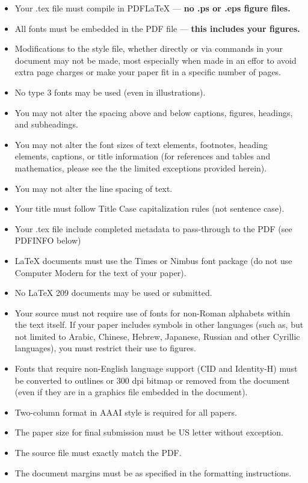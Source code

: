 \documentclass[letterpaper]{article} %
\begin{document}
\begin{itemize}
\item Your .tex file must compile in PDF\LaTeX{} --- \textbf{ no .ps or .eps figure files.}
\item All fonts must be embedded in the PDF file --- \textbf{ this includes your figures.}
\item Modifications to the style file, whether directly or via commands in your document may not be made, most especially when made in an effor to avoid extra page charges or make your paper fit in a specific number of pages.
\item No type 3 fonts may be used (even in illustrations).
\item You may not alter the spacing above and below captions, figures, headings, and subheadings.
\item You may not alter the font sizes of text elements, footnotes, heading elements, captions, or title information (for references and tables and mathematics, please see the the limited exceptions provided herein).
\item You may not alter the line spacing of text.
\item Your title must follow Title Case capitalization rules (not sentence case).
\item Your .tex file include completed metadata to pass-through to the PDF (see PDFINFO below)
\item \LaTeX{} documents must use the Times or Nimbus font package (do not use Computer Modern for the text of your paper).
\item No \LaTeX{} 209 documents may be used or submitted.
\item Your source must not require use of fonts for non-Roman alphabets within the text itself. If your paper includes symbols in other languages (such as, but not limited to Arabic, Chinese, Hebrew, Japanese, Russian and other Cyrillic languages), you must restrict their use to figures.
\item Fonts that require non-English language support (CID and Identity-H) must be converted to outlines or 300 dpi bitmap or removed from the document (even if they are in a graphics file embedded in the document). 
\item Two-column format in AAAI style is required for all papers.
\item The paper size for final submission must be US letter without exception.
\item The source file must exactly match the PDF.
\item The document margins must be as specified in the formatting instructions.

\end{itemize}
\end{document}
